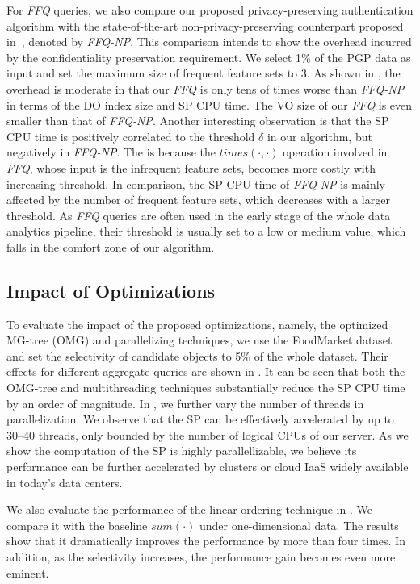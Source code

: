 For \emph{FFQ} queries, we also compare our proposed privacy-preserving authentication algorithm with the state-of-the-art non-privacy-preserving counterpart proposed in~\cite{10.1109/icdm.2013.81}, denoted by \emph{FFQ-NP}. This comparison intends to show the overhead incurred by the confidentiality preservation requirement. We select 1\% of the PGP data as input and set the maximum size of frequent feature sets to 3. As shown in , the overhead is moderate in that our \emph{FFQ} is only tens of times worse than \emph{FFQ-NP} in terms of the DO index size and SP CPU time. The VO size of our \emph{FFQ} is even smaller than that of \emph{FFQ-NP}. Another interesting observation is that the SP CPU time is positively correlated to the threshold $\delta$ in our algorithm, but negatively in \emph{FFQ-NP}. The is because the $times(\cdot,\cdot)$ operation involved in \emph{FFQ}, whose input is the infrequent feature sets, becomes more costly with increasing threshold. In comparison, the SP CPU time of \emph{FFQ-NP} is mainly affected by the number of frequent feature sets, which decreases with a larger threshold.
As \emph{FFQ} queries are often used in the early stage of the whole data analytics pipeline, their threshold is usually set to a low or medium value, which falls in the comfort zone of our algorithm.

\subsection{Impact of Optimizations}

To evaluate the impact of the proposed optimizations, namely, the optimized MG-tree (OMG) and parallelizing techniques, we use the FoodMarket dataset and set the selectivity of candidate objects to 5\% of the whole dataset. Their effects for different aggregate queries are shown in . It can be seen that both the OMG-tree and multithreading techniques substantially reduce the SP CPU time by an order of magnitude.
In , we further vary the number of threads in parallelization. We observe that the SP can be effectively accelerated by up to 30--40 threads, only bounded by the number of logical CPUs of our server. As we show the computation of the SP is highly parallellizable, we believe its performance can be further accelerated by clusters or cloud IaaS widely available in today's data centers.

We also evaluate the performance of the linear ordering technique in . We compare it with the baseline $sum(\cdot)$ under one-dimensional data. The results show that it dramatically improves the performance by more than four times. In addition, as the selectivity increases, the performance gain becomes even more eminent.

